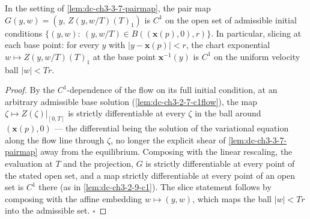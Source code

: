 \begin{lemma}
  \label{lem:dc-ch3-3-7-c1pair}
  \leanok
  In the setting of \cref{lem:dc-ch3-3-7-pairmap}, the pair map
  $G(y,w)=(y,\,Z(y,w/T)(T)_1)$ is $C^1$ on the open set of admissible initial
  conditions $\{(y,w):\ (y,w/T)\in B((\mathbf{x}(p),0),r)\}$. In particular,
  slicing at each base point: for every $y$ with $|y-\mathbf{x}(p)|<r$, the
  chart exponential $w\mapsto Z(y,w/T)(T)_1$ at the base point
  $\mathbf{x}^{-1}(y)$ is $C^1$ on the uniform velocity ball $|w|<Tr$.
\end{lemma}
\begin{proof}
  \leanok
  By the $C^1$-dependence of the flow on its full initial condition, at an
  arbitrary admissible base solution (\cref{lem:dc-ch3-2-7-c1flow}), the map
  $\zeta\mapsto Z(\zeta)|_{[0,T]}$ is strictly differentiable at every $\zeta$
  in the ball around $(\mathbf{x}(p),0)$ — the differential being the solution
  of the variational equation along the flow line through $\zeta$, no longer
  the explicit shear of \cref{lem:dc-ch3-3-7-pairmap} away from the
  equilibrium. Composing with the linear rescaling, the evaluation at $T$ and
  the projection, $G$ is strictly differentiable at every point of the stated
  open set, and a map strictly differentiable at every point of an open set is
  $C^1$ there (as in \cref{lem:dc-ch3-2-9-c1}). The slice statement follows by
  composing with the affine embedding $w\mapsto(y,w)$, which maps the ball
  $|w|<Tr$ into the admissible set. $\square$
\end{proof}

